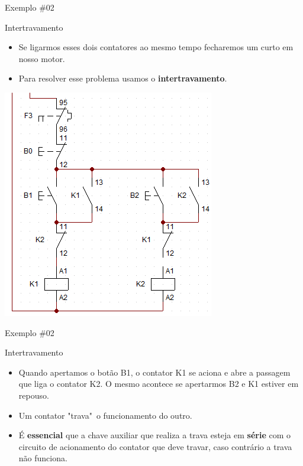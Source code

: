 \begin{frame}{Exemplo \#02}
\begin{block}{Intertravamento}
\begin{itemize}
    \item Se ligarmos esses dois contatores ao mesmo tempo fecharemos um curto em nosso motor.
    \item Para resolver esse problema usamos o \textbf{intertravamento}.
\end{itemize}
\end{block}
\centerline{\includegraphics[height=0.6\textheight]{Figuras/Ch07/fig9.jpg}}
\end{frame}

\begin{frame}{Exemplo \#02}
\begin{block}{Intertravamento}
\begin{itemize}
    \item Quando apertamos o botão B1, o contator K1 se aciona e abre a passagem que liga o contator K2. O mesmo acontece se apertarmos B2 e K1 estiver em repouso.
    \item Um contator "trava"~o funcionamento do outro.
    \item É \textbf{essencial} que a chave auxiliar que realiza a trava esteja em \textbf{série} com o circuito de acionamento do contator que deve travar, caso contrário a trava não funciona.
\end{itemize}
\end{block}
\end{frame}


